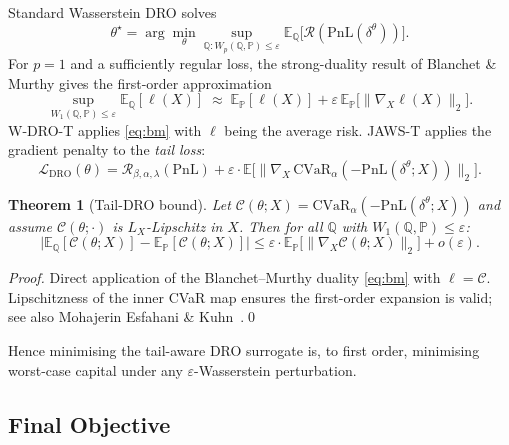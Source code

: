 \documentclass[11pt,a4paper]{article}
\newtheorem{theorem}{Theorem}
\begin{document}
Standard Wasserstein DRO solves
\begin{equation}
\theta^\star = \arg\min_\theta \sup_{\mathbb{Q}: W_p(\mathbb{Q}, \mathbb{P})\leq \varepsilon}
\mathbb{E}_\mathbb{Q}\big[\mathcal{R}(\mathrm{PnL}(\delta^\theta))\big].
\end{equation}
For $p=1$ and a sufficiently regular loss, the strong-duality result of
Blanchet \& Murthy \cite{BM2019} gives the first-order approximation
\begin{equation}
\sup_{W_1(\mathbb{Q},\mathbb{P})\leq \varepsilon}\mathbb{E}_\mathbb{Q}[\ell(X)]
\;\approx\; \mathbb{E}_\mathbb{P}[\ell(X)] + \varepsilon\, \mathbb{E}_\mathbb{P}\big[\|\nabla_X \ell(X)\|_2\big].
\label{eq:bm}
\end{equation}
W-DRO-T applies \eqref{eq:bm} with $\ell$ being the average risk. JAWS-T
applies the gradient penalty to the \emph{tail loss}:
\begin{equation}
\mathcal{L}_{\mathrm{DRO}}(\theta) =
\mathcal{R}_{\beta,\alpha,\lambda}(\mathrm{PnL})
+ \varepsilon \cdot \mathbb{E}\Big[\big\| \nabla_X\, \mathrm{CVaR}_\alpha(-\mathrm{PnL}(\delta^\theta;X))\big\|_2\Big].
\end{equation}

\begin{theorem}[Tail-DRO bound]\label{thm:tail-dro}
Let $\mathcal{C}(\theta;X) = \mathrm{CVaR}_\alpha(-\mathrm{PnL}(\delta^\theta;X))$
and assume $\mathcal{C}(\theta;\cdot)$ is $L_X$-Lipschitz in $X$. Then for all
$\mathbb{Q}$ with $W_1(\mathbb{Q},\mathbb{P})\leq \varepsilon$:
\begin{equation}
\big| \mathbb{E}_\mathbb{Q}[\mathcal{C}(\theta;X)] - \mathbb{E}_\mathbb{P}[\mathcal{C}(\theta;X)] \big|
\leq \varepsilon \cdot \mathbb{E}_\mathbb{P}\big[\|\nabla_X \mathcal{C}(\theta;X)\|_2\big] + o(\varepsilon).
\end{equation}
\end{theorem}

\begin{proof}
Direct application of the Blanchet--Murthy duality \eqref{eq:bm} with $\ell =
\mathcal{C}$. Lipschitzness of the inner CVaR map ensures the first-order
expansion is valid; see also Mohajerin Esfahani \& Kuhn~\cite{MEK2018}.\qed
\end{proof}

Hence minimising the tail-aware DRO surrogate is, to first order, minimising
worst-case capital under any $\varepsilon$-Wasserstein perturbation.

\subsection{Final Objective}
\end{document}
